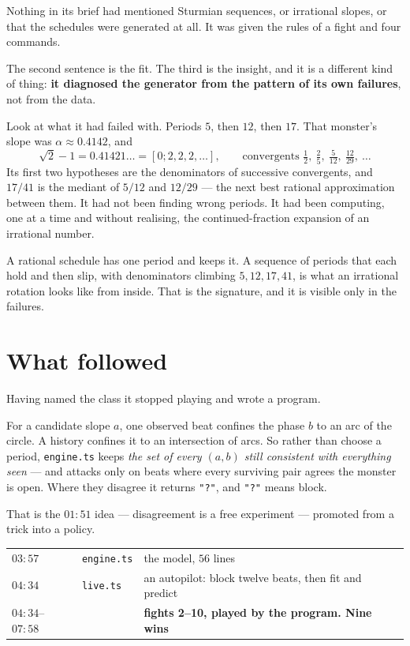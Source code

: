\documentclass[11pt,a4paper]{article}
\newcommand{\code}[1]{\texttt{\small #1}}
\begin{document}
Nothing in its brief had mentioned Sturmian sequences, or irrational slopes, or
that the schedules were generated at all. It was given the rules of a fight and
four commands.

The second sentence is the fit. The third is the insight, and it is a different
kind of thing: \textbf{it diagnosed the generator from the pattern of its own
failures}, not from the data.

Look at what it had failed with. Periods $5$, then $12$, then $17$. That
monster's slope was $\alpha \approx 0.4142$, and
\[
  \sqrt{2} - 1 = 0.41421\ldots = [0;2,2,2,\ldots],
  \qquad
  \text{convergents } \tfrac12,\ \tfrac25,\ \tfrac{5}{12},\ \tfrac{12}{29},\ \ldots
\]
Its first two hypotheses are the denominators of successive convergents, and
$17/41$ is the mediant of $5/12$ and $12/29$ --- the next best rational
approximation between them. It had not been finding wrong periods. It had been
computing, one at a time and without realising, the continued-fraction expansion
of an irrational number.

A rational schedule has one period and keeps it. A sequence of periods that each
hold and then slip, with denominators climbing $5, 12, 17, 41$, is what an
irrational rotation looks like from inside. That is the signature, and it is
visible only in the failures.

\section{What followed}

Having named the class it stopped playing and wrote a program.

For a candidate slope $a$, one observed beat confines the phase $b$ to an arc of
the circle. A history confines it to an intersection of arcs. So rather than
choose a period, \code{engine.ts} keeps \emph{the set of every $(a,b)$ still
consistent with everything seen} --- and attacks only on beats where every
surviving pair agrees the monster is open. Where they disagree it returns
\code{"?"}, and \code{"?"} means block.

That is the $01{:}51$ idea --- disagreement is a free experiment --- promoted
from a trick into a policy.

\begin{center}
\begin{tabular}{lll}
\toprule
$03{:}57$ & \code{engine.ts} & the model, $56$ lines \\
$04{:}34$ & \code{live.ts}   & an autopilot: block twelve beats, then fit and predict \\
$04{:}34$--$07{:}58$ & & \textbf{fights 2--10, played by the program. Nine wins} \\
\bottomrule
\end{tabular}
\end{center}
\end{document}
